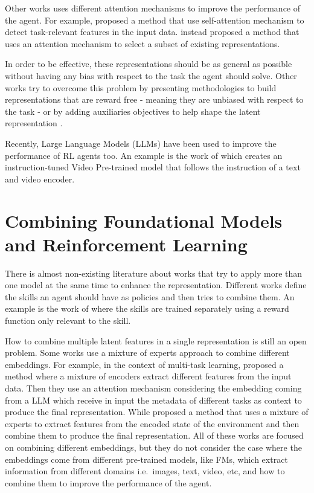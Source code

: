 Other works uses different attention mechanisms to improve the performance of the agent.
For example, \citet{bramlage2022generalized} proposed a method that use self-attention mechanism to detect task-relevant features in the input data.
\citet{blakeman2022selective} instead proposed a method that uses an attention mechanism to select a subset of existing representations.

In order to be effective, these representations should be as general as possible without having any bias with respect to the task the agent should solve.
Other works try to overcome this problem by presenting methodologies to build representations that are reward free - meaning they are unbiased with respect to the task \citep{stooke2021decoupling} - or by adding auxiliaries objectives to help shape the latent representation \citep{lan2023bootstrapped}.

Recently, Large Language Models (LLMs) have been used to improve the performance of RL agents too.
An example is the work of \citet{lifshitz2024steve} which creates an instruction-tuned Video Pre-trained model that follows the instruction of a text and video encoder.





\section{Combining Foundational Models and Reinforcement Learning}\label{sec:fm_rl_combination}
There is almost non-existing literature about works that try to apply more than one model at the same time to enhance the representation.
Different works define the skills an agent should have as policies and then tries to combine them.
An example is the work of \citet{sahni2017learning} where the skills are trained separately using a reward function only relevant to the skill.

How to combine multiple latent features in a single representation is still an open problem.
Some works use a mixture of experts approach to combine different embeddings.
For example, in the context of multi-task learning, \citet{sodhani2021multi} proposed a method where a mixture of encoders extract different features from the input data.
Then they use an attention mechanism considering the embedding coming from a LLM which receive in input the metadata of different tasks as context to produce the final representation.
While \citet{obando2024mixtures} proposed a method that uses a mixture of experts to extract features from the encoded state of the environment and then combine them to produce the final representation.
All of these works are focused on combining different embeddings, but they do not consider the case where the embeddings come from different pre-trained models, like FMs, which extract information from different domains i.e.\ images, text, video, etc, and how to combine them to improve the performance of the agent.

